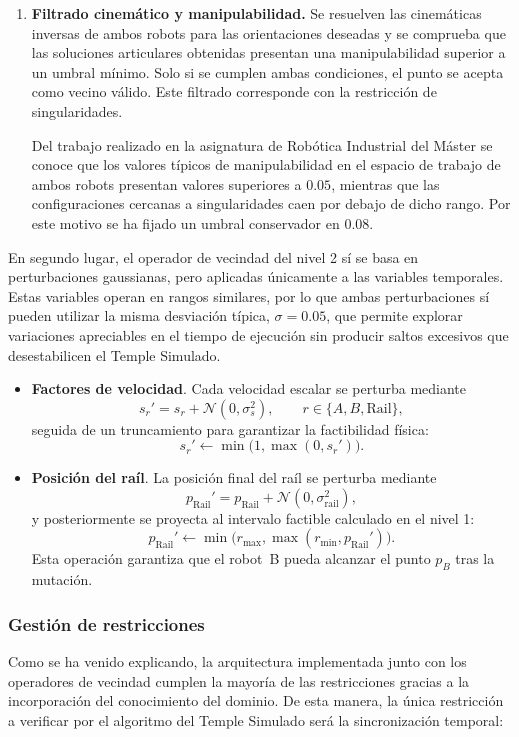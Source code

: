 \begin{enumerate}
    \item \textbf{Filtrado cinemático y manipulabilidad.}
    Se resuelven las cinemáticas inversas de ambos robots para las orientaciones
    deseadas y se comprueba que las soluciones articulares obtenidas presentan
    una manipulabilidad superior a un umbral mínimo. Solo si se cumplen ambas
    condiciones, el punto se acepta como vecino válido. Este filtrado corresponde 
    con la restricción de singularidades.

    Del trabajo realizado en la asignatura de Robótica Industrial del Máster 
    se conoce que los valores típicos de manipulabilidad en el espacio de trabajo
    de ambos robots presentan valores superiores a \(0.05\), mientras que las 
    configuraciones cercanas a singularidades caen por debajo de dicho rango. 
    Por este motivo se ha fijado un umbral conservador en $0.08$.
\end{enumerate}

En segundo lugar, el operador de vecindad del nivel 2 sí se basa en perturbaciones 
gaussianas, pero aplicadas únicamente a las variables temporales. Estas variables operan
en rangos similares, por lo que ambas perturbaciones sí pueden utilizar la misma 
desviación típica, $\sigma = 0.05$, que permite explorar
variaciones apreciables en el tiempo de ejecución sin producir saltos
excesivos que desestabilicen el Temple Simulado.

\begin{itemize}
    \item \textbf{Factores de velocidad}.  
    Cada velocidad escalar se perturba mediante
\[
        s_r' = s_r + \mathcal{N}(0,\sigma_s^2),
        \qquad r \in \{A, B, \text{Rail}\},
    \]
    seguida de un truncamiento para garantizar la factibilidad física:
\[
        s_r' \leftarrow \min\big(1,\max(0,s_r')\big).
    \]

    \item \textbf{Posición del raíl}.  
    La posición final del raíl se perturba mediante
\[
        p_{\text{Rail}}' = p_{\text{Rail}} + \mathcal{N}(0,\sigma_{\text{rail}}^2),
    \]
    y posteriormente se proyecta al intervalo factible calculado en el nivel 1:
\[
        p_{\text{Rail}}' \leftarrow
        \min\big(r_{\max},\max(r_{\min},p_{\text{Rail}}')\big).
    \]
    Esta operación garantiza que el robot~B pueda alcanzar el punto \(p_B\) tras
    la mutación.

\end{itemize}

\subsubsection*{Gestión de restricciones}
Como se ha venido explicando, la arquitectura implementada junto con los operadores 
de vecindad cumplen la mayoría de las restricciones gracias a la incorporación 
del conocimiento del dominio. De esta manera, la única restricción a verificar por 
el algoritmo del Temple Simulado será la sincronización temporal:

